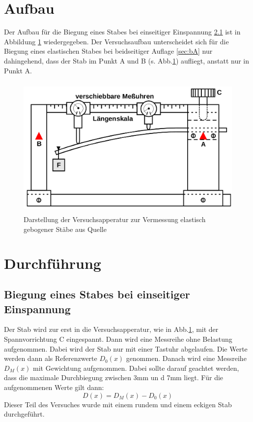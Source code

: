 \section{Aufbau}
\label{sec:Aufbau}
Der Aufbau für die Biegung eines Stabes bei einseitiger Einspannung \ref{sec:eE}
ist in
Abbildung \ref{fig:abb6} wiedergegeben. Der Versuchsaufbau unterscheidet sich
für die Biegung eines elastischen Stabes bei beidseitiger Auflage
\ref{sec:bA} nur
dahingehend, dass der Stab im Punkt A und B (s. Abb.\ref{fig:abb6}) aufliegt,
anstatt nur in Punkt A.
\begin{figure}
  \centering
  \includegraphics[height = 7cm]{logos/Abb6.png}
  \caption{Darstellung der Versuchsapperatur zur Vermessung elastisch gebogener
  Stäbe aus Quelle \cite{Anleitung}}
  \label{fig:abb6}
\end{figure}
\FloatBarrier
\section{Durchführung}
\label{sec:Durchführung}
\subsection{Biegung eines Stabes bei einseitiger Einspannung}
\label{sec:eE}
Der Stab wird zur erst in die Versuchsapperatur, wie in Abb.\ref{fig:abb6},
mit der Spannvorrichtung C eingespannt. Dann wird eine Messreihe ohne Belastung
aufgenommen. Dabei wird der Stab nur mit einer Tastuhr abgelaufen. Die Werte
werden dann als Referenzwerte $D_0 (x)$ genommen. Danach wird eine
Messreihe $D_M (x)$
mit Gewichtung aufgenommen. Dabei sollte darauf geachtet werden, dass
die maximale Durchbiegung zwischen 3mm un d 7mm liegt. Für die aufgenommenen
Werte gilt dann:
\begin{equation}
  D(x) = D_M (x) - D_0 (x)
  \label{eqn:DM0}
\end{equation}
Dieser Teil des Versuches wurde mit einem rundem und einem eckigen Stab
durchgeführt.
